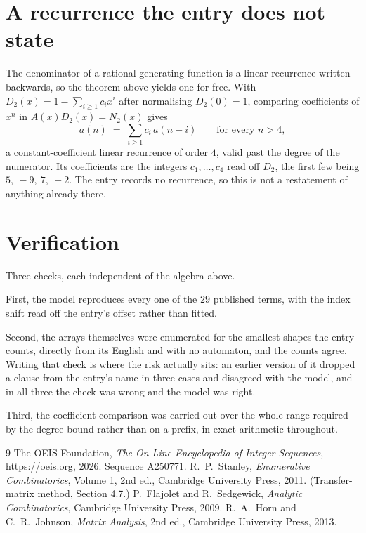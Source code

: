 \documentclass[11pt,a4paper]{article}
\theoremstyle{plain}
\theoremstyle{definition}
\begin{document}
\section{A recurrence the entry does not state}

The denominator of a rational generating function is a linear recurrence written backwards, so
the theorem above yields one for free. With $D_2(x)=1-\sum_{i\ge1}c_ix^i$ after normalising
$D_2(0)=1$, comparing coefficients of $x^n$ in $A(x)D_2(x)=N_2(x)$ gives
\[
a(n)\;=\;\sum_{i\ge1}c_i\,a(n-i)\qquad\text{for every }n>4,
\]
a constant-coefficient linear recurrence of order $4$, valid past the degree of the
numerator. Its coefficients are the integers $c_1,\dots,c_{4}$ read off $D_2$, the first few being $5,\ -9,\ 7,\ -2$. The entry records no recurrence, so this is not a restatement of anything
already there.

\section{Verification}

Three checks, each independent of the algebra above.

First, the model reproduces every one of the $29$ published terms, with the index shift
read off the entry's offset rather than fitted.

Second, the arrays themselves were enumerated for the smallest shapes the entry counts,
directly from its English and with no automaton, and the counts agree. Writing that check is
where the risk actually sits: an earlier version of it dropped a clause from the entry's name
in three cases and disagreed with the model, and in all three the check was wrong and the model
was right.

Third, the coefficient comparison was carried out over the whole range required by the degree
bound rather than on a prefix, in exact arithmetic throughout.

\begin{thebibliography}{9}
 The OEIS Foundation, \emph{The On-Line Encyclopedia of Integer
Sequences}, \url{https://oeis.org}, 2026. Sequence A250771.
 R.~P.~Stanley, \emph{Enumerative Combinatorics}, Volume 1, 2nd ed.,
Cambridge University Press, 2011. (Transfer-matrix method, Section 4.7.)
 P.~Flajolet and R.~Sedgewick, \emph{Analytic Combinatorics}, Cambridge
University Press, 2009.
 R.~A.~Horn and C.~R.~Johnson, \emph{Matrix Analysis}, 2nd ed., Cambridge
University Press, 2013.
\end{thebibliography}
\end{document}
